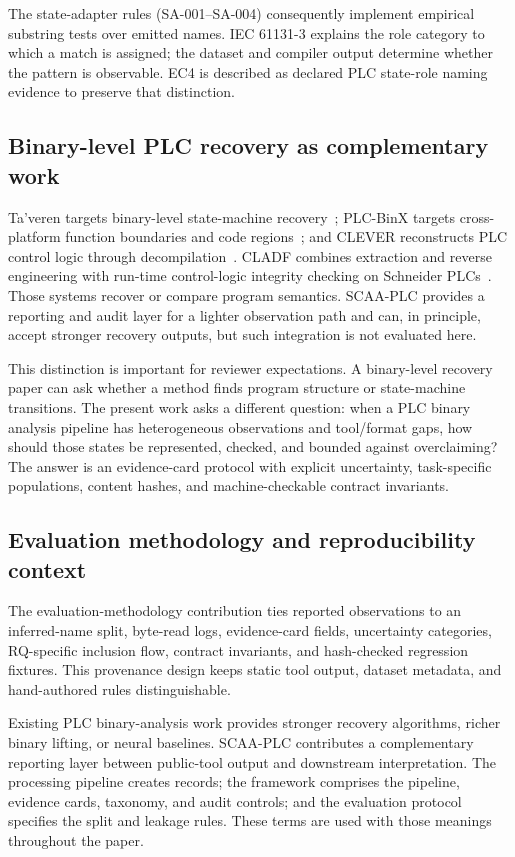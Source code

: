 \documentclass[a4paper,fleqn]{cas-dc}
\begin{document}
The state-adapter rules (SA-001--SA-004) consequently implement empirical substring tests over emitted names. IEC 61131-3 explains the role category to which a match is assigned; the dataset and compiler output determine whether the pattern is observable. EC4 is described as declared PLC state-role naming evidence to preserve that distinction.

\subsection{Binary-level PLC recovery as complementary work}

Ta'veren targets binary-level state-machine recovery~\citep{taveren_ndss2026}; PLC-BinX targets cross-platform function boundaries and code regions~\citep{plcbinx_arxiv2026}; and CLEVER reconstructs PLC control logic through decompilation~\citep{clever_tifs2024}. CLADF combines extraction and reverse engineering with run-time control-logic integrity checking on Schneider PLCs~\citep{cladf_jiot2024}. Those systems recover or compare program semantics. SCAA-PLC provides a reporting and audit layer for a lighter observation path and can, in principle, accept stronger recovery outputs, but such integration is not evaluated here.

This distinction is important for reviewer expectations. A binary-level recovery paper can ask whether a method finds program structure or state-machine transitions. The present work asks a different question: when a PLC binary analysis pipeline has heterogeneous observations and tool/format gaps, how should those states be represented, checked, and bounded against overclaiming? The answer is an evidence-card protocol with explicit uncertainty, task-specific populations, content hashes, and machine-checkable contract invariants.

\subsection{Evaluation methodology and reproducibility context}

The evaluation-methodology contribution ties reported observations to an inferred-name split, byte-read logs, evidence-card fields, uncertainty categories, RQ-specific inclusion flow, contract invariants, and hash-checked regression fixtures. This provenance design keeps static tool output, dataset metadata, and hand-authored rules distinguishable.

Existing PLC binary-analysis work provides stronger recovery algorithms, richer binary lifting, or neural baselines. SCAA-PLC contributes a complementary reporting layer between public-tool output and downstream interpretation. The processing pipeline creates records; the framework comprises the pipeline, evidence cards, taxonomy, and audit controls; and the evaluation protocol specifies the split and leakage rules. These terms are used with those meanings throughout the paper.
\end{document}
